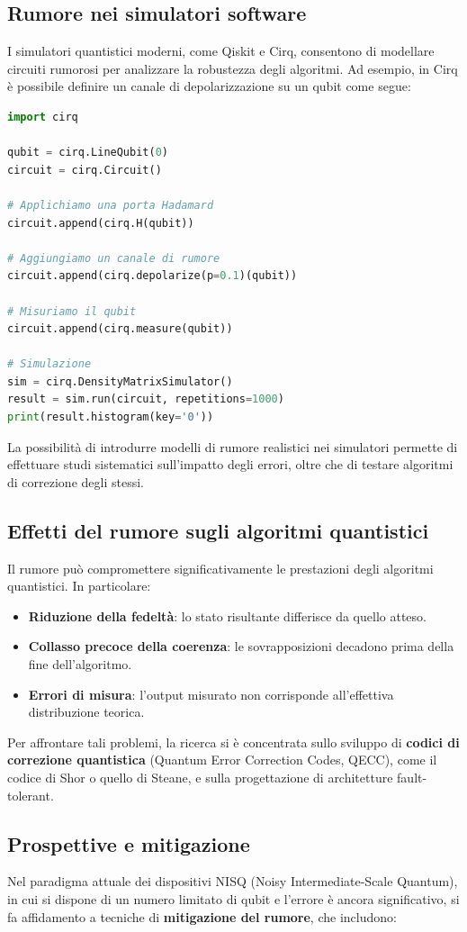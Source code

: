 \documentclass[a4paper,12pt]{report}
\theoremstyle{plain}
\begin{document}
\subsection{Rumore nei simulatori software}
I simulatori quantistici moderni, come Qiskit e Cirq, consentono di modellare circuiti rumorosi per analizzare la robustezza degli algoritmi. Ad esempio, in Cirq è possibile definire un canale di depolarizzazione su un qubit come segue:
\begin{lstlisting}[language=Python, caption={Esempio di rumore depolarizzante in Cirq}]
import cirq

qubit = cirq.LineQubit(0)
circuit = cirq.Circuit()

# Applichiamo una porta Hadamard
circuit.append(cirq.H(qubit))

# Aggiungiamo un canale di rumore
circuit.append(cirq.depolarize(p=0.1)(qubit))

# Misuriamo il qubit
circuit.append(cirq.measure(qubit))

# Simulazione
sim = cirq.DensityMatrixSimulator()
result = sim.run(circuit, repetitions=1000)
print(result.histogram(key='0'))
\end{lstlisting}
La possibilità di introdurre modelli di rumore realistici nei simulatori permette di effettuare studi sistematici sull'impatto degli errori, oltre che di testare algoritmi di correzione degli stessi.
\subsection{Effetti del rumore sugli algoritmi quantistici}
Il rumore può compromettere significativamente le prestazioni degli algoritmi quantistici. In particolare:
\begin{itemize}
  \item \textbf{Riduzione della fedeltà}: lo stato risultante differisce da quello atteso.
  \item \textbf{Collasso precoce della coerenza}: le sovrapposizioni decadono prima della fine dell'algoritmo.
  \item \textbf{Errori di misura}: l'output misurato non corrisponde all'effettiva distribuzione teorica.
\end{itemize}
Per affrontare tali problemi, la ricerca si è concentrata sullo sviluppo di \textbf{codici di correzione quantistica} (Quantum Error Correction Codes, QECC), come il codice di Shor o quello di Steane, e sulla progettazione di architetture fault-tolerant.
\subsection{Prospettive e mitigazione}
Nel paradigma attuale dei dispositivi NISQ (Noisy Intermediate-Scale Quantum), in cui si dispone di un numero limitato di qubit e l'errore è ancora significativo, si fa affidamento a tecniche di \textbf{mitigazione del rumore}, che includono:
\end{document}
